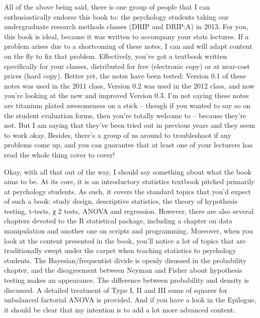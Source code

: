 \documentclass[
]{book}
\begin{document}
All of the above being said, there is one group of people that I can
enthusiastically endorse this book to: the psychology students taking
our undergraduate research methods classes (DRIP and DRIP:A) in 2013.
For you, this book is ideal, because it was written to accompany your
stats lectures. If a problem arises due to a shortcoming of these notes,
I can and will adapt content on the fly to fix that problem.
Effectively, you've got a textbook written specifically for your
classes, distributed for free (electronic copy) or at near-cost prices
(hard copy). Better yet, the notes have been tested: Version 0.1 of
these notes was used in the 2011 class, Version 0.2 was used in the 2012
class, and now you're looking at the new and improved Version 0.3. I'm
not saying these notes are titanium plated awesomeness on a stick --
though if you wanted to say so on the student evaluation forms, then
you're totally welcome to -- because they're not. But I am saying that
they've been tried out in previous years and they seem to work okay.
Besides, there's a group of us around to troubleshoot if any problems
come up, and you can guarantee that at least one of your lecturers has
read the whole thing cover to cover!

Okay, with all that out of the way, I should say something about what
the book aims to be. At its core, it is an introductory statistics
textbook pitched primarily at psychology students. As such, it covers
the standard topics that you'd expect of such a book: study design,
descriptive statistics, the theory of hypothesis testing, t-tests, χ 2
tests, ANOVA and regression. However, there are also several chapters
devoted to the R statistical package, including a chapter on data
manipulation and another one on scripts and programming. Moreover, when
you look at the content presented in the book, you'll notice a lot of
topics that are traditionally swept under the carpet when teaching
statistics to psychology students. The Bayesian/frequentist divide is
openly disussed in the probability chapter, and the disagreement between
Neyman and Fisher about hypothesis testing makes an appearance. The
difference between probability and density is discussed. A detailed
treatment of Type I, II and III sums of squares for unbalanced factorial
ANOVA is provided. And if you have a look in the Epilogue, it should be
clear that my intention is to add a lot more advanced content.
\end{document}
